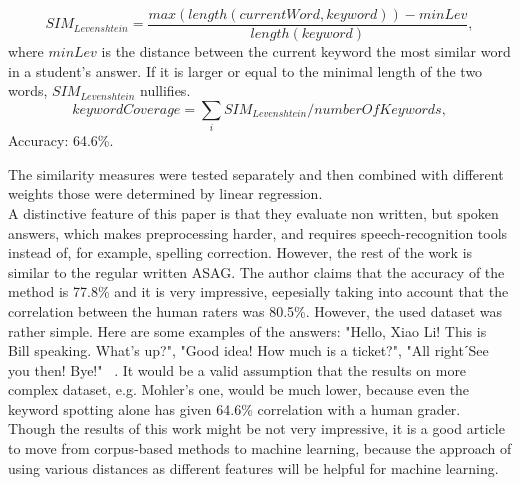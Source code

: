 \begin{itemize}
\begin{equation} \label{eq:Levenshtein}
SIM_{Levenshtein} = \frac{max(length(currentWord,keyword)) - minLev}{length(keyword)},
\end{equation}
where $minLev$ is the distance between the current keyword the most similar word in a student's answer. If it is larger or equal to the minimal length of the two words, $SIM_{Levenshtein}$ nullifies. 
\begin{equation} \label{eq:keywordCover}
keywordCoverage = \sum_{i} SIM_{Levenshtein} / numberOfKeywords,
\end{equation}
Accuracy: 64.6\%.
\end{itemize}

The similarity measures were tested separately and then combined with different weights those were determined by linear regression.\\

A distinctive feature of this paper is that they evaluate non written, but spoken answers, which makes preprocessing harder, and requires speech-recognition tools instead of, for example, spelling correction. However, the rest of the work is similar to the regular written ASAG. The author claims that the accuracy of the method is 77.8\% and it is very impressive, eepesially taking into account that the correlation between the human raters was 80.5\%. However, the used dataset was rather simple. Here are some examples of the answers: "Hello, Xiao Li! This is Bill speaking. What's up?", "Good idea! How much is a ticket?", "All rightˊSee you then! Bye!" ~\cite{Li}. It would be a valid assumption that the results on more complex dataset, e.g. Mohler's one, would be much lower, because even the keyword spotting alone has given 64.6\% correlation with a human grader. Though the results of this work might be not very impressive, it is a good article to move from corpus-based methods to machine learning, because the approach of using various distances as different features will be helpful for machine learning.\\

